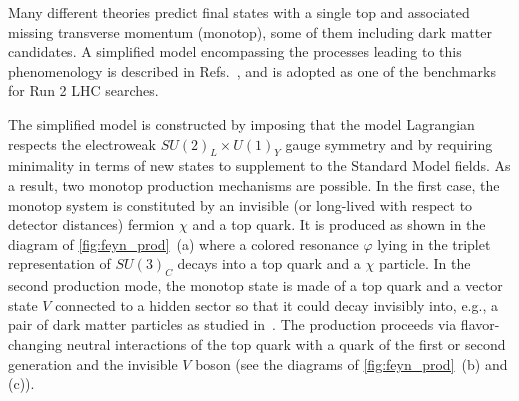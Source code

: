 Many different theories predict final states with a single top and associated missing 
transverse momentum (monotop), some of them including dark matter candidates. 
A simplified model encompassing the processes leading to this phenomenology is described in Refs.~\cite{AndreaFuksMaltoni,Agram:2013wda,Boucheneb:2014wza},
and is adopted as one of the benchmarks for Run 2 LHC searches. 

The simplified model is constructed by imposing that the model Lagrangian
respects the electroweak $SU(2)_L \times U(1)_Y$ gauge symmetry and by
requiring minimality in terms of new states to supplement to the Standard
Model fields. As a result, two monotop production mechanisms are possible.
In the first case, the monotop system is constituted by an invisible (or
long-lived with respect to detector distances) fermion $\chi$ and a top quark.
It is produced as shown in the diagram of \ref{fig:feyn_prod}~(a) where a colored
resonance $\varphi$ lying in the triplet representation of $SU(3)_C$ decays
into a top quark and a $\chi$ particle. In the second production mode, the
monotop state is made of a top quark and a vector state $V$ connected to a
hidden sector so that it could decay invisibly into, e.g., a pair of dark
matter particles as studied in~\cite{Boucheneb:2014wza}. The production proceeds via
flavor-changing neutral interactions of the top quark with a quark of the
first or second generation and the invisible $V$ boson (see the diagrams of
\ref{fig:feyn_prod}~(b) and (c)).

